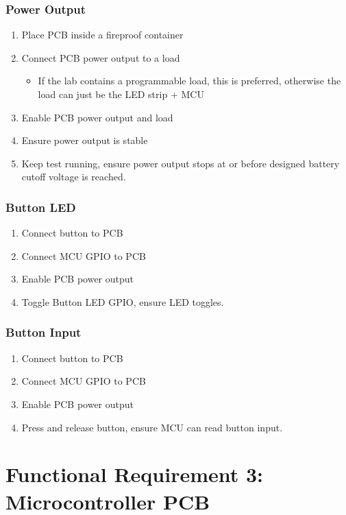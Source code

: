\documentclass{notes}
\begin{document}
\subsubsection{Power Output}

\begin{enumerate}
    \item Place PCB inside a fireproof container
    \item Connect PCB power output to a load
        \begin{itemize}
            \item If the lab contains a programmable load, this is preferred, otherwise the load can just be the LED strip + MCU
        \end{itemize}
    \item Enable PCB power output and load
    \item Ensure power output is stable
    \item Keep test running, ensure power output stops at or before designed battery cutoff voltage is reached.
\end{enumerate}

\subsubsection{Button LED}

\begin{enumerate}
    \item Connect button to PCB
    \item Connect MCU GPIO to PCB
    \item Enable PCB power output
    \item Toggle Button LED GPIO, ensure LED toggles.
\end{enumerate}

\subsubsection{Button Input}

\begin{enumerate}
    \item Connect button to PCB
    \item Connect MCU GPIO to PCB
    \item Enable PCB power output
    \item Press and release button, ensure MCU can read button input.
\end{enumerate}

\section{Functional Requirement 3: Microcontroller PCB}
\end{document}
